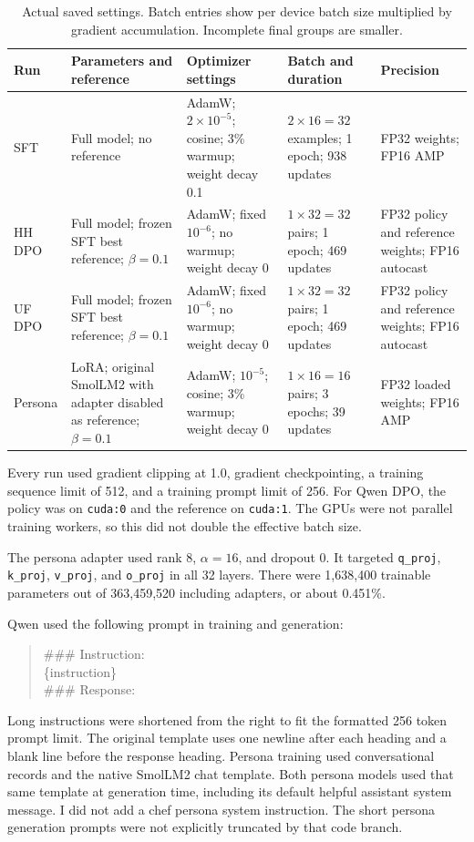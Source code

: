 \documentclass[11pt,a4paper]{article}
\newcommand{\code}[1]{\texttt{\small #1}}
\begin{document}
\begin{table}[htbp]
\centering\footnotesize
\begin{tabularx}{\linewidth}{@{}lYYYY@{}}
\toprule
Run & Parameters and reference & Optimizer settings & Batch and duration & Precision \\
\midrule
SFT & Full model; no reference & AdamW; $2\!\times\!10^{-5}$; cosine; 3\% warmup; weight decay 0.1 & $2\times16=32$ examples; 1 epoch; 938 updates & FP32 weights; FP16 AMP \\
HH DPO & Full model; frozen SFT best reference; $\beta=0.1$ & AdamW; fixed $10^{-6}$; no warmup; weight decay 0 & $1\times32=32$ pairs; 1 epoch; 469 updates & FP32 policy and reference weights; FP16 autocast \\
UF DPO & Full model; frozen SFT best reference; $\beta=0.1$ & AdamW; fixed $10^{-6}$; no warmup; weight decay 0 & $1\times32=32$ pairs; 1 epoch; 469 updates & FP32 policy and reference weights; FP16 autocast \\
Persona & LoRA; original SmolLM2 with adapter disabled as reference; $\beta=0.1$ & AdamW; $10^{-5}$; cosine; 3\% warmup; weight decay 0 & $1\times16=16$ pairs; 3 epochs; 39 updates & FP32 loaded weights; FP16 AMP \\
\bottomrule
\end{tabularx}
\caption{Actual saved settings. Batch entries show per device batch size multiplied by gradient accumulation. Incomplete final groups are smaller.}
\end{table}

Every run used gradient clipping at 1.0, gradient checkpointing, a training sequence limit of 512, and a training prompt limit of 256. For Qwen DPO, the policy was on \code{cuda:0} and the reference on \code{cuda:1}. The GPUs were not parallel training workers, so this did not double the effective batch size.

The persona adapter used rank 8, $\alpha=16$, and dropout 0. It targeted \code{q\_proj}, \code{k\_proj}, \code{v\_proj}, and \code{o\_proj} in all 32 layers. There were 1,638,400 trainable parameters out of 363,459,520 including adapters, or about 0.451\%.

Qwen used the following prompt in training and generation:
\begin{quote}\ttfamily\small
\#\#\# Instruction:\\
\{instruction\}\\[3pt]
\#\#\# Response:
\end{quote}
Long instructions were shortened from the right to fit the formatted 256 token prompt limit. The original template uses one newline after each heading and a blank line before the response heading. Persona training used conversational records and the native SmolLM2 chat template. Both persona models used that same template at generation time, including its default helpful assistant system message. I did not add a chef persona system instruction. The short persona generation prompts were not explicitly truncated by that code branch.
\end{document}
